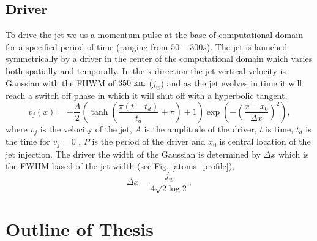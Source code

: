 \documentclass[12pt]{ociamthesis}
\newcommand{\fref}[1]{Fig. \eqref{#1}}
\begin{document}
\subsection{Driver}
\label{subsec:driver}
To drive the jet we us a momentum pulse at the base of computational domain for a specified period of time (ranging from $50-300s$). The jet is launched symmetrically by a driver in the center of the computational domain which varies both spatially and temporally. In the x-direction the jet vertical velocity is Gaussian with the FHWM of $350 \ \rm{km}$ ($j_w$) and as the jet evolves in time it will reach a switch off phase in which it will shut off with a hyperbolic tangent,
\begin{equation}
v_{j}(x) = -\frac{A}{2} \left( \tanh \left( \frac{\pi (t-t_{d})}{t_d}+ \pi \right) +1 \right) \exp \left( - \left(\frac{x-x_0}{\Delta x} \right)^2  \right),
\end{equation}    
where $v_j$ is the velocity of the jet, $A$ is the amplitude of the driver, $t$ is time, $t_{d}$ is the time for $v_j=0$ , $P$ is the period of the driver and $x_0$ is central location of the jet injection. The driver the width of the Gaussian is determined by $\Delta x$ which is the FWHM based of the jet width (see \fref{atoms_profile}),
\begin{equation}
\Delta x = \dfrac{j_w}{4 \sqrt{2 \log{2}}},
\end{equation}  

\section{Outline of Thesis}
\end{document}
